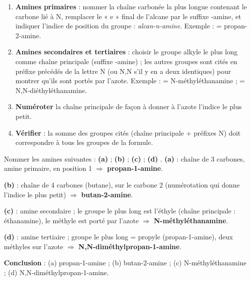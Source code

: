 \documentclass[11pt]{article}
\newcommand{\cle}[1]{{\popxbold\color{popdark}#1}}
\begin{document}
\begin{methode}
\begin{enumerate}
\item \textbf{Amines primaires}  : nommer la chaîne carbonée la plus longue contenant le carbone lié à N, remplacer le « e » final de l'alcane par le suffixe \cle{-amine}, et indiquer l'indice de position du groupe  : \emph{alcan-n-amine}. Exemple :  = propan-2-amine.
\item \textbf{Amines secondaires et tertiaires} : choisir le groupe alkyle le plus long comme chaîne principale (suffixe \cle{-amine}) ; les autres groupes sont cités en préfixe précédés de la lettre \cle{N} (ou \cle{N,N} s'il y en a deux identiques) pour montrer qu'ils sont portés par l'azote. Exemple :  = N-méthyléthanamine ;  = N,N-diéthyléthanamine.
\item \textbf{Numéroter} la chaîne principale de façon à donner à l'azote l'indice le plus petit.
\item \textbf{Vérifier} : la somme des groupes cités (chaîne principale + préfixes N) doit correspondre à tous les groupes de la formule.
\end{enumerate}
\end{methode}

\begin{exoresolu}
Nommer les amines suivantes :
\textbf{(a)}  ; \textbf{(b)}  ; \textbf{(c)}  ; \textbf{(d)} .
\tcblower
\textbf{(a)}  : chaîne de 3 carbones, amine primaire,  en position 1 $\Rightarrow$ \textbf{propan-1-amine}.

\textbf{(b)}  : chaîne de 4 carbones (butane),  sur le carbone 2 (numérotation qui donne l'indice le plus petit) $\Rightarrow$ \textbf{butan-2-amine}.

\textbf{(c)}  : amine secondaire ; le groupe le plus long est l'éthyle (chaîne principale : éthanamine), le méthyle est porté par l'azote $\Rightarrow$ \textbf{N-méthyléthanamine}.

\textbf{(d)}  : amine tertiaire ; groupe le plus long = propyle (propan-1-amine), deux méthyles sur l'azote $\Rightarrow$ \textbf{N,N-diméthylpropan-1-amine}.

\textbf{Conclusion} : (a) propan-1-amine ; (b) butan-2-amine ; (c) N-méthyléthanamine ; (d) N,N-diméthylpropan-1-amine.
\end{exoresolu}
\end{document}
